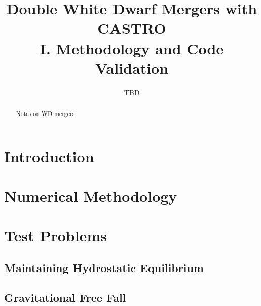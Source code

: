 \documentclass[12pt,preprint]{aastex}
\begin{document}
\title{Double White Dwarf Mergers with CASTRO\\ I. Methodology and Code Validation}


\author{TBD}
\begin{abstract}
Notes on WD mergers
\end{abstract}

\section{Introduction}



\section{Numerical Methodology}\label{sec:Numerical Methodology}


\section{Test Problems}\label{Sec:Tests}

\subsection{Maintaining Hydrostatic Equilibrium}\label{Sec:HSE}

\subsection{Gravitational Free Fall}\label{Sec:Gravitational Free Fall}
\end{document}
